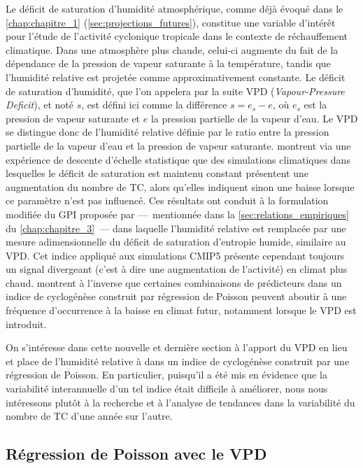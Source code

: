 \documentclass[../main.tex]{subfiles}
\begin{document}
Le déficit de saturation d'humidité atmosphérique, comme déjà évoqué dans le \cref{chap:chapitre_1} (\cref{sec:projections_futures}), constitue une variable
d'intérêt pour l'étude de l'activité cyclonique tropicale dans le contexte de réchauffement climatique. Dans une atmosphère plus chaude, celui-ci augmente du
fait de la dépendance de la pression de vapeur saturante à la température, tandis que l'humidité relative est projetée comme approximativement constante. Le
déficit de saturation d'humidité, que l'on appelera par la suite VPD (\textit{Vapour-Pressure Deficit}), et noté $s$, est défini ici comme la différence $s =
e_s - e$, où $e_s$ est la pression de vapeur saturante et $e$ la pression partielle de la vapeur d'eau. Le VPD se distingue donc de l'humidité
relative définie par le ratio entre la pression partielle de la vapeur d'eau et la pression de vapeur saturante. \textcite{emanuel_hurricanes_2008} montrent via
une expérience de descente d'échelle statistique que des simulations climatiques dans lesquelles le déficit de saturation est maintenu constant présentent une
augmentation du nombre de TC, alors qu'elles indiquent sinon une baisse lorsque ce paramètre n'est pas influencé. Ces résultats ont conduit à la formulation
modifiée du GPI proposée par \textcite{emanuel_tropical_2010} ---~mentionnée dans la \cref{sec:relations_empiriques} du \cref{chap:chapitre_3}~--- dans laquelle
l'humidité relative est remplacée par une mesure adimensionnelle du déficit de saturation d'entropie humide, similaire au VPD. Cet indice appliqué aux
simulations CMIP5 présente cependant toujours un signal divergeant (c'est à dire une augmentation de l'activité) en climat plus chaud.
\textcite{camargo_testing_2014} montrent à l'inverse que certaines combinaisons de prédicteurs dans un indice de cyclogénèse construit par régression de Poisson
peuvent aboutir à une fréquence d'occurrence à la baisse en climat futur, notamment lorsque le VPD est introduit.

On s'intéresse dans cette nouvelle et dernière section à l'apport du VPD en lieu et place de l'humidité relative à  dans un indice de cyclogénèse
construit par une régression de Poisson. En particulier, puisqu'il a été mis en évidence que la variabilité interannuelle d'un tel indice était difficile à
améliorer, nous nous intéressons plutôt à la recherche et à l'analyse de tendances dans la variabilité du nombre de TC d'une année sur l'autre.

\subsection{Régression de Poisson avec le VPD}
\end{document}

